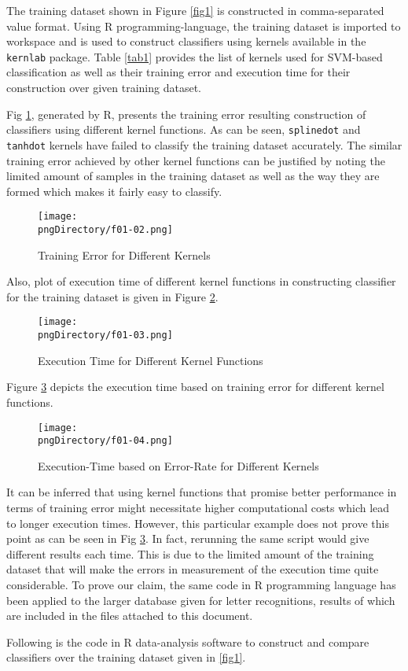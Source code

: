 The training dataset shown in Figure \ref{fig1} is constructed in comma-separated value format. Using R programming-language, the training dataset is imported to workspace and is used to construct classifiers using kernels available in the \texttt{kernlab} package. Table \ref{tab1} provides the list of kernels used for SVM-based classification as well as their training error and execution time for their construction over given training dataset.

Fig \ref{fig2}, generated by R, presents the training error resulting construction of  classifiers using different kernel functions. As can be seen, \texttt{splinedot} and \texttt{tanhdot} kernels have failed to classify the training dataset accurately. The similar training error achieved by other kernel functions can be justified by noting the limited amount of samples in the training dataset as well as the way they are formed  which makes it fairly easy to classify.

\begin{figure}\centering
\texttt{[image: \\pngDirectory/f01-02.png]}
\caption{Training Error for Different Kernels}\label{fig2}
\end{figure}

Also, plot of execution time of different kernel functions in constructing classifier for the training dataset is given in Figure \ref{fig3}.

\begin{figure}\centering
\texttt{[image: \\pngDirectory/f01-03.png]}
\caption{Execution Time for Different Kernel Functions}\label{fig3}
\end{figure}

Figure \ref{fig4} depicts the execution time based on training error for different kernel functions.

\begin{figure}\centering
\texttt{[image: \\pngDirectory/f01-04.png]}
\caption{Execution-Time based on Error-Rate for Different Kernels}\label{fig4}
\end{figure}

It can be inferred that using kernel functions that promise better performance in terms of training error might necessitate higher computational costs which lead to longer execution times. However, this particular example does not prove this point as can be seen in Fig \ref{fig4}. In fact, rerunning the same script would give different results each time. This is due to the limited amount of the training dataset that will make the errors in measurement of the execution time quite considerable. To prove our claim, the same code in R programming language has been applied to the larger database given for letter recognitions, results of which are included in the files attached to this document.

Following is the code in R data-analysis software to construct and compare classifiers over the training dataset given in \ref{fig1}.

\lstset{language=r,tabsize=4}

